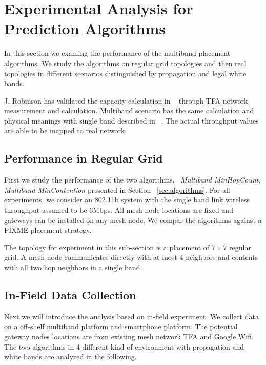 \section{Experimental Analysis for Prediction Algorithms}
\label{sec:experiment_design}


In this section we examing the performance of the multiband placement algorithms. We study the algorithms on regular grid topologies and then real topologies in different scenarios distinguished by propagation and legal white bands.

J. Robinson has validated the capacity calculation in ~\cite{robinson2008adding} through TFA network measurement and calculation. Multiband scenario has the same calculation and physical meanings with single band described in ~\cite{robinson2008adding}.
The actual throughput values are able to be mapped to real network.

\subsection{Performance in Regular Grid}
\label{subsec:regulargrid}

First we study the performance of the two algorithms, ~\emph{Multiband MinHopCount, Multiband MinContention} presented in Section ~\ref{sec:algorithms}.
For all experiments, we consider an 802.11b system with the single band link wireless throughput assumed to be 6Mbps.
All mesh node locations are fixed and gateways can be installed on any mesh node.
We compar the algorithms against a FIXME placement strategy.

The topology for experiment in this sub-section is a placement of $7 \times 7$ regular grid. A mesh node communicates directly with at most 4 neighbors and contents with all two hop neighbors in a single band.






\subsection{In-Field Data Collection}
\label{exp:datacollection}
Next we will introduce the analysis based on in-field experiment. We collect data on a off-shelf multiband platform and smartphone platform. The potential gateway nodes locations are from existing mesh network TFA and Google Wifi. 
The two algorithms in 4 different kind of environment with propagation and white bands are analyzed in the following.

